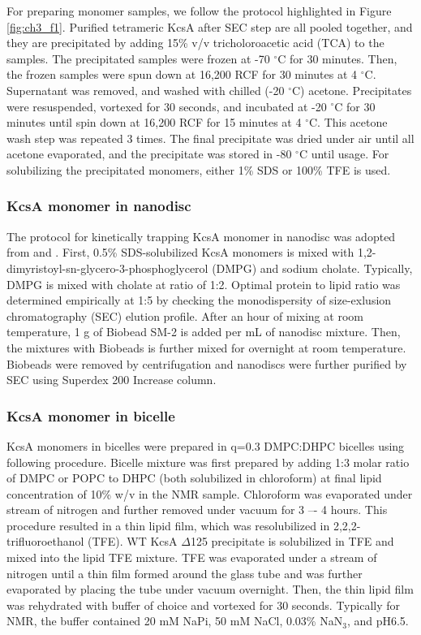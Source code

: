 For preparing monomer samples, we follow the protocol highlighted in Figure \ref{fig:ch3_f1}. Purified tetrameric KcsA after SEC step are all pooled together, and they are precipitated by adding 15\% v/v tricholoroacetic acid (TCA) to the samples. The precipitated samples were frozen at -70 $^{\circ}$C for 30 minutes. Then, the frozen samples were spun down at 16,200 RCF for 30 minutes at 4 $^{\circ}$C. Supernatant was removed, and washed with chilled (-20 $^{\circ}$C) acetone. Precipitates were resuspended, vortexed for 30 seconds, and incubated at -20 $^{\circ}$C for 30 minutes until spin down at 16,200 RCF for 15 minutes at 4 $^{\circ}$C. This acetone wash step was repeated 3 times. The final precipitate was dried under air until all acetone evaporated, and the precipitate was stored in -80 $^{\circ}$C until usage. For solubilizing the precipitated monomers, either 1\% SDS or 100\% TFE is used.

\subsubsection{KcsA monomer in nanodisc}
The protocol for kinetically trapping KcsA monomer in nanodisc was adopted from \citep{hagn2013} and \citep{ritchie2009}. First, 0.5\% SDS-solubilized KcsA monomers is mixed with 1,2-dimyristoyl-sn-glycero-3-phosphoglycerol (DMPG) and sodium cholate. Typically, DMPG is mixed with cholate at ratio of 1:2. Optimal protein to lipid ratio was determined empirically at 1:5 by checking the monodispersity of size-exlusion chromatography (SEC) elution profile. After an hour of mixing at room temperature, 1 g of Biobead SM-2 is added per mL of nanodisc mixture. Then, the mixtures with Biobeads is further mixed for overnight at room temperature. Biobeads were removed by centrifugation and nanodiscs were further purified by SEC using Superdex 200 Increase column. 

\subsubsection{KcsA monomer in bicelle}
KcsA monomers in bicelles were prepared in q=0.3 DMPC:DHPC bicelles using following procedure. Bicelle mixture was first prepared by adding 1:3 molar ratio of DMPC or POPC to DHPC (both solubilized in chloroform) at final lipid concentration of 10\% w/v in the NMR sample. Chloroform was evaporated under stream of nitrogen and further removed under vacuum for 3 –- 4 hours. This procedure resulted in a thin lipid film, which was resolubilized in 2,2,2-trifluoroethanol (TFE). WT KcsA $\Delta$125 precipitate is solubilized in TFE and mixed into the lipid TFE mixture. TFE was evaporated under a stream of nitrogen until a thin film formed around the glass tube and was further evaporated by placing the tube under vacuum overnight. Then, the thin lipid film was rehydrated with buffer of choice and vortexed for 30 seconds. Typically for NMR, the buffer contained 20 mM NaPi, 50 mM NaCl, 0.03\% NaN$_{3}$, and pH6.5. 

